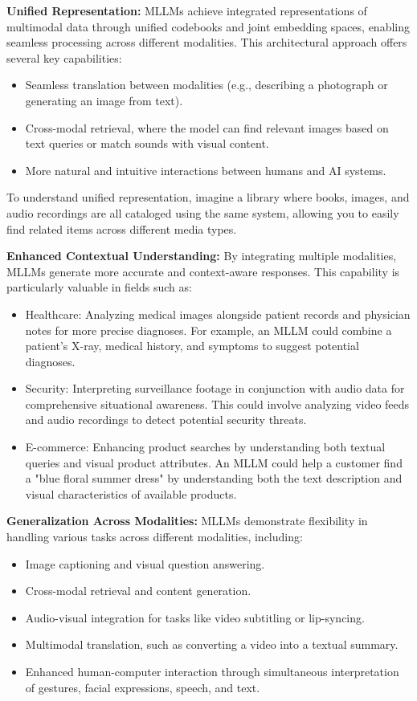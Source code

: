 \textbf{Unified Representation:} MLLMs achieve integrated representations of multimodal data through unified codebooks and joint embedding spaces, enabling seamless processing across different modalities. This architectural approach offers several key capabilities:

\begin{itemize}
    \item Seamless translation between modalities (e.g., describing a photograph or generating an image from text).
    \item Cross-modal retrieval, where the model can find relevant images based on text queries or match sounds with visual content.
    \item More natural and intuitive interactions between humans and AI systems.
\end{itemize}

To understand unified representation, imagine a library where books, images, and audio recordings are all cataloged using the same system, allowing you to easily find related items across different media types.

\textbf{Enhanced Contextual Understanding:} By integrating multiple modalities, MLLMs generate more accurate and context-aware responses. This capability is particularly valuable in fields such as:

\begin{itemize}
    \item Healthcare: Analyzing medical images alongside patient records and physician notes for more precise diagnoses. For example, an MLLM could combine a patient's X-ray, medical history, and symptoms to suggest potential diagnoses.
    \item Security: Interpreting surveillance footage in conjunction with audio data for comprehensive situational awareness. This could involve analyzing video feeds and audio recordings to detect potential security threats.
    \item E-commerce: Enhancing product searches by understanding both textual queries and visual product attributes. An MLLM could help a customer find a "blue floral summer dress" by understanding both the text description and visual characteristics of available products.
\end{itemize}

\textbf{Generalization Across Modalities:} MLLMs demonstrate flexibility in handling various tasks across different modalities, including:

\begin{itemize}
    \item Image captioning and visual question answering.
    \item Cross-modal retrieval and content generation.
    \item Audio-visual integration for tasks like video subtitling or lip-syncing.
    \item Multimodal translation, such as converting a video into a textual summary.
    \item Enhanced human-computer interaction through simultaneous interpretation of gestures, facial expressions, speech, and text.
\end{itemize}

